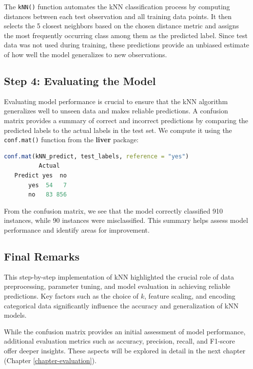 \documentclass[
]{book}
\newcommand{\passthrough}[1]{#1}
\theoremstyle{definition}
\theoremstyle{definition}
\theoremstyle{definition}
\theoremstyle{definition}
\theoremstyle{remark}
\begin{document}
The \passthrough{\lstinline!kNN()!} function automates the kNN classification process by computing distances between each test observation and all training data points. It then selects the 5 closest neighbors based on the chosen distance metric and assigns the most frequently occurring class among them as the predicted label. Since test data was not used during training, these predictions provide an unbiased estimate of how well the model generalizes to new observations.

\subsection{Step 4: Evaluating the Model}\label{step-4-evaluating-the-model}

Evaluating model performance is crucial to ensure that the kNN algorithm generalizes well to unseen data and makes reliable predictions. A confusion matrix provides a summary of correct and incorrect predictions by comparing the predicted labels to the actual labels in the test set. We compute it using the \passthrough{\lstinline!conf.mat()!} function from the \textbf{liver} package:

\begin{lstlisting}[language=R]
conf.mat(kNN_predict, test_labels, reference = "yes")
          Actual
   Predict yes  no
       yes  54   7
       no   83 856
\end{lstlisting}

From the confusion matrix, we see that the model correctly classified 910 instances, while 90 instances were misclassified. This summary helps assess model performance and identify areas for improvement.

\subsection*{Final Remarks}\label{final-remarks}

This step-by-step implementation of kNN highlighted the crucial role of data preprocessing, parameter tuning, and model evaluation in achieving reliable predictions. Key factors such as the choice of \(k\), feature scaling, and encoding categorical data significantly influence the accuracy and generalization of kNN models.

While the confusion matrix provides an initial assessment of model performance, additional evaluation metrics such as accuracy, precision, recall, and F1-score offer deeper insights. These aspects will be explored in detail in the next chapter (Chapter \ref{chapter-evaluation}).
\end{document}
